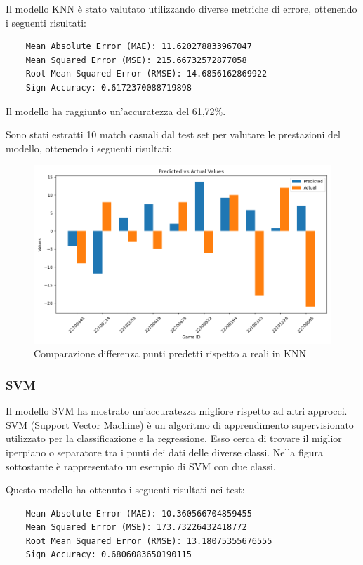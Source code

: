 \documentclass[a4paper]{article}
\numberwithin{equation}{section}
\begin{document}
Il modello KNN è stato valutato utilizzando diverse metriche di errore, ottenendo i seguenti risultati:
\begin{lstlisting}
    Mean Absolute Error (MAE): 11.620278833967047
    Mean Squared Error (MSE): 215.66732572877058
    Root Mean Squared Error (RMSE): 14.6856162869922
    Sign Accuracy: 0.6172370088719898
\end{lstlisting}
Il modello ha raggiunto un'accuratezza del 61,72\%.

Sono stati estratti 10 match casuali dal test set per valutare le prestazioni del modello, ottenendo i seguenti risultati:
\begin{figure}[H]
    \centering
    \includegraphics[width=0.7\linewidth]{img/knn_istogramma.png}
    \caption{Comparazione differenza punti predetti rispetto a reali in KNN}
    \label{fig:enter-label}
\end{figure}

\subsubsection{SVM}

Il modello SVM ha mostrato un'accuratezza migliore rispetto ad altri approcci. SVM (Support Vector Machine) è un algoritmo di apprendimento supervisionato utilizzato per la classificazione e la regressione. Esso cerca di trovare il miglior iperpiano o separatore tra i punti dei dati delle diverse classi. Nella figura sottostante è rappresentato un esempio di SVM con due classi.

Questo modello ha ottenuto i seguenti risultati nei test:

\begin{lstlisting}
    Mean Absolute Error (MAE): 10.360566704859455
    Mean Squared Error (MSE): 173.73226432418772
    Root Mean Squared Error (RMSE): 13.18075355676555
    Sign Accuracy: 0.6806083650190115
\end{lstlisting}
\end{document}
